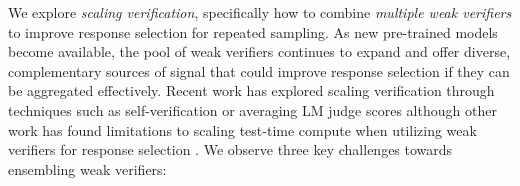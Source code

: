 We explore \textit{scaling verification}, specifically how to combine \textit{multiple weak verifiers} to improve response selection for repeated sampling.
As new pre-trained models become available, the pool of weak verifiers continues to expand and offer diverse, complementary sources of signal that could improve response selection if they can be aggregated effectively.
Recent work has explored scaling verification through techniques such as self-verification or averaging LM judge scores \citep{lifshitz2025multiagentverificationscalingtesttime, zhao2025sample, chen2025sets} although other work has found limitations to scaling test-time compute when utilizing weak verifiers for response selection \citep{stroebl2024inferencescalingflawslimits}.  
We observe three key challenges towards ensembling weak verifiers:



